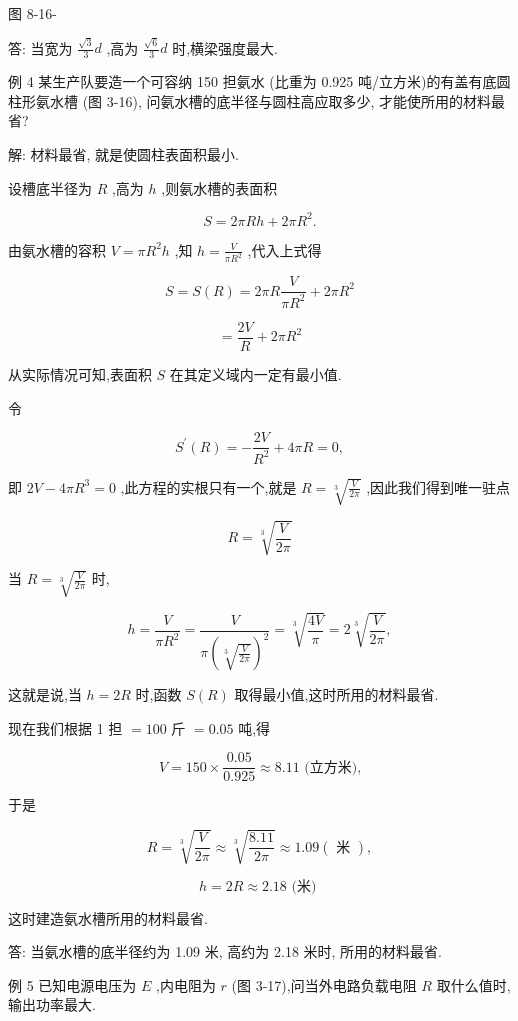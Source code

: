 \documentclass[lang=cn,newtx,10pt,scheme=chinese]{elegantbook}
\begin{document}
图 8-16-

答: 当宽为 \(\frac{\sqrt{3}}{3}d\) ,高为 \(\frac{\sqrt{6}}{3}d\) 时,横梁强度最大.

例 4 某生产队要造一个可容纳 150 担氨水 (比重为 0.925 吨/立方米)的有盖有底圆柱形氨水槽 (图 3-16), 问氨水槽的底半径与圆柱高应取多少, 才能使所用的材料最省?

解: 材料最省, 就是使圆柱表面积最小.

设槽底半径为 \(R\) ,高为 \(h\) ,则氨水槽的表面积

\[
S = {2\pi Rh} + {2\pi }{R}^{2}.
\]

由氨水槽的容积 \(V = \pi {R}^{2}h\) ,知 \(h = \frac{V}{\pi {R}^{2}}\) ,代入上式得

\[
S = S\left( R\right) = {2\pi R}\frac{V}{\pi {R}^{2}} + {2\pi }{R}^{2}
\]

\[
= \frac{2V}{R} + {2\pi }{R}^{2}
\]

从实际情况可知,表面积 \(S\) 在其定义域内一定有最小值.

令

\[
{S}^{\prime }\left( R\right) = - \frac{2V}{{R}^{2}} + {4\pi R} = 0,
\]

即 \({2V} - {4\pi }{R}^{3} = 0\) ,此方程的实根只有一个,就是 \(R = \sqrt[3]{\frac{V}{2\pi }}\) ,因此我们得到唯一驻点

\[
R = \sqrt[3]{\frac{V}{2\pi }}
\]

当 \(R = \sqrt[3]{\frac{V}{2\pi }}\) 时,

\[
h = \frac{V}{\pi {R}^{2}} = \frac{V}{\pi {\left( \sqrt[3]{\frac{V}{2\pi }}\right) }^{2}} = \sqrt[3]{\frac{4V}{\pi }} = 2\sqrt[3]{\frac{V}{2\pi }},
\]

这就是说,当 \(h = {2R}\) 时,函数 \(S\left( R\right)\) 取得最小值,这时所用的材料最省.

现在我们根据 1 担 \(= {100}\) 斤 \(= {0.05}\) 吨,得

\[
V = {150} \times \frac{0.05}{0.925} \approx {8.11}\text{ (立方米),}
\]

于是

\[
R = \sqrt[3]{\frac{V}{2\pi }} \approx \sqrt[3]{\frac{8.11}{2\pi }} \approx {1.09}\left( \text{ 米 }\right) ,
\]

\[
h = {2R} \approx {2.18}\text{ (米) }
\]

这时建造氨水槽所用的材料最省.

答: 当氨水槽的底半径约为 1.09 米, 高约为 2.18 米时, 所用的材料最省.

例 5 已知电源电压为 \(E\) ,内电阻为 \(r\) (图 3-17),问当外电路负载电阻 \(R\) 取什么值时,输出功率最大.
\end{document}
